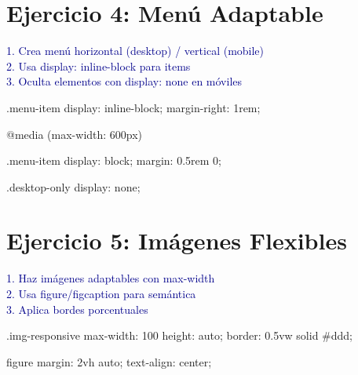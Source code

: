 \documentclass[12pt, a4paper]{article}
\newcommand{\enunciado}[1]{
    \vspace{0.5em}
    \noindent\colorbox{blue!10}{
        \parbox{\dimexpr\textwidth-2\fboxsep}{
            \small\sffamily\textcolor{darkblue}{#1}
        }
    }
    \vspace{0.5em}
}
\begin{document}

\section*{Ejercicio 4: Menú Adaptable}
\enunciado{
    1. Crea menú horizontal (desktop) / vertical (mobile) \\
    2. Usa display: inline-block para items \\
    3. Oculta elementos con display: none en móviles
}

\begin{codebox}[title=CSS]
.menu-item {
    display: inline-block;
    margin-right: 1rem;
}

@media (max-width: 600px) {
    .menu-item {
        display: block;
        margin: 0.5rem 0;
    }
    
    .desktop-only {
        display: none;
    }
}
\end{codebox}

\section*{Ejercicio 5: Imágenes Flexibles}
\enunciado{
    1. Haz imágenes adaptables con max-width \\
    2. Usa figure/figcaption para semántica \\
    3. Aplica bordes porcentuales
}

\begin{codebox}[title=CSS]
.img-responsive {
    max-width: 100%
    height: auto;
    border: 0.5vw solid #ddd;
}

figure {
    margin: 2vh auto;
    text-align: center;
}
\end{codebox}
\end{document}
